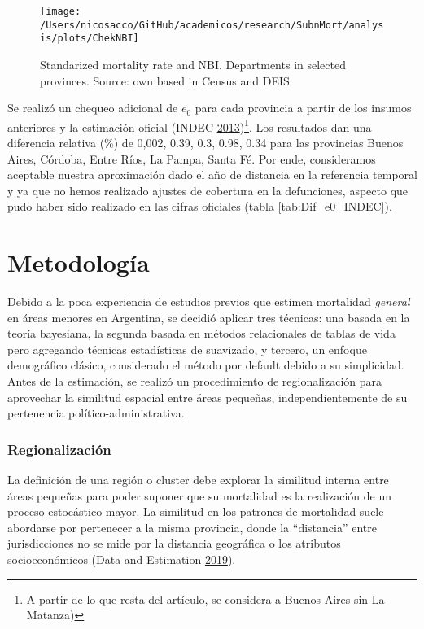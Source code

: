 \documentclass[12pt,]{article}
\begin{document}
\begin{figure}

{\centering \texttt{[image: /Users/nicosacco/GitHub/academicos/research/SubnMort/analysis/plots/ChekNBI]} 

}

\caption{Standarized mortality rate and NBI. Departments in selected provinces. Source: own based in Census and DEIS}\label{fig:NBI}
\end{figure}

Se realizó un chequeo adicional de \(e_0\) para cada provincia a partir
de los insumos anteriores y la estimación oficial (INDEC
\protect\hyperlink{ref-INDEC2013}{2013})\footnote{A partir de lo que
  resta del artículo, se considera a Buenos Aires sin La Matanza)}. Los
resultados dan una diferencia relativa (\%) de 0,002, 0.39, 0.3, 0.98,
0.34 para las provincias Buenos Aires, Córdoba, Entre Ríos, La Pampa,
Santa Fé. Por ende, consideramos aceptable nuestra aproximación dado el
año de distancia en la referencia temporal y ya que no hemos realizado
ajustes de cobertura en la defunciones, aspecto que pudo haber sido
realizado en las cifras oficiales (tabla \ref{tab:Dif_e0_INDEC}).

\hypertarget{metodologuxeda}{%
\section{\texorpdfstring{\textbf{Metodología}}{Metodología}}\label{metodologuxeda}}

Debido a la poca experiencia de estudios previos que estimen mortalidad
\emph{general} en áreas menores en Argentina, se decidió aplicar tres
técnicas: una basada en la teoría bayesiana, la segunda basada en
métodos relacionales de tablas de vida pero agregando técnicas
estadísticas de suavizado, y tercero, un enfoque demográfico clásico,
considerado el método por default debido a su simplicidad. Antes de la
estimación, se realizó un procedimiento de regionalización para
aprovechar la similitud espacial entre áreas pequeñas,
independientemente de su pertenencia político-administrativa.

\hypertarget{regionalizaciuxf3n}{%
\subsubsection{\texorpdfstring{\textbf{Regionalización}}{Regionalización}}\label{regionalizaciuxf3n}}

La definición de una región o cluster debe explorar la similitud interna
entre áreas pequeñas para poder suponer que su mortalidad es la
realización de un proceso estocástico mayor. La similitud en los
patrones de mortalidad suele abordarse por pertenecer a la misma
provincia, donde la ``distancia'' entre jurisdicciones no se mide por la
distancia geográfica o los atributos socioeconómicos (Data and
Estimation \protect\hyperlink{ref-Longford2005}{2019}).
\end{document}

